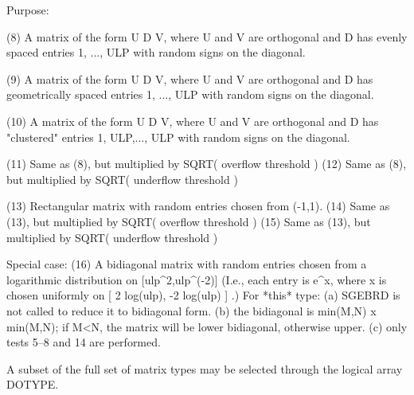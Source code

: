\begin{DoxyParagraph}{Purpose\+: }
\begin{DoxyVerb}
 (8)  A matrix of the form  U D V, where U and V are orthogonal and
      D has evenly spaced entries 1, ..., ULP with random signs
      on the diagonal.

 (9)  A matrix of the form  U D V, where U and V are orthogonal and
      D has geometrically spaced entries 1, ..., ULP with random
      signs on the diagonal.

 (10) A matrix of the form  U D V, where U and V are orthogonal and
      D has "clustered" entries 1, ULP,..., ULP with random
      signs on the diagonal.

 (11) Same as (8), but multiplied by SQRT( overflow threshold )
 (12) Same as (8), but multiplied by SQRT( underflow threshold )

 (13) Rectangular matrix with random entries chosen from (-1,1).
 (14) Same as (13), but multiplied by SQRT( overflow threshold )
 (15) Same as (13), but multiplied by SQRT( underflow threshold )

 Special case:
 (16) A bidiagonal matrix with random entries chosen from a
      logarithmic distribution on [ulp^2,ulp^(-2)]  (I.e., each
      entry is  e^x, where x is chosen uniformly on
      [ 2 log(ulp), -2 log(ulp) ] .)  For *this* type:
      (a) SGEBRD is not called to reduce it to bidiagonal form.
      (b) the bidiagonal is  min(M,N) x min(M,N); if M<N, the
          matrix will be lower bidiagonal, otherwise upper.
      (c) only tests 5--8 and 14 are performed.

 A subset of the full set of matrix types may be selected through
 the logical array DOTYPE.\end{DoxyVerb}
 
\end{DoxyParagraph}

